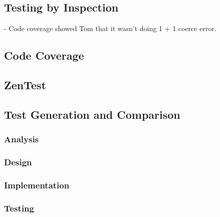   \subsection{Testing by Inspection}
  - Code coverage showed Tom that it wasn't doing 1 + 1 coerce error.
  \subsection{Code Coverage}
  \subsection{ZenTest}
  \subsection{Test Generation and Comparison}
    \subsubsection{Analysis}
    \subsubsection{Design}
    \subsubsection{Implementation}
    \subsubsection{Testing}
